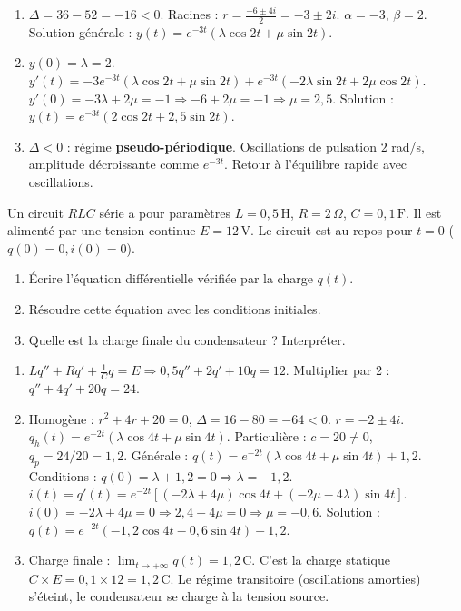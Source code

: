 \documentclass[11pt]{article}
\begin{document}
\begin{corrige}[Exercice]
\begin{enumerate}
\item $\Delta = 36 - 52 = -16 < 0$. Racines : $r = \frac{-6 \pm 4i}{2} = -3 \pm 2i$. $\alpha = -3$, $\beta = 2$.
Solution générale : $y(t) = e^{-3t}(\lambda \cos 2t + \mu \sin 2t)$.
\item $y(0) = \lambda = 2$.
$y'(t) = -3e^{-3t}(\lambda \cos 2t + \mu \sin 2t) + e^{-3t}(-2\lambda \sin 2t + 2\mu \cos 2t)$.
$y'(0) = -3\lambda + 2\mu = -1 \Rightarrow -6 + 2\mu = -1 \Rightarrow \mu = 2,5$.
Solution : $\boxed{y(t) = e^{-3t}(2\cos 2t + 2,5\sin 2t)}$.
\item $\Delta < 0$ : régime \textbf{pseudo-périodique}. Oscillations de pulsation $2$ rad/s, amplitude décroissante comme $e^{-3t}$. Retour à l'équilibre rapide avec oscillations.
\end{enumerate}
\end{corrige}

\begin{exercice}
Un circuit $RLC$ série a pour paramètres $L = 0,5\,\text{H}$, $R = 2\,\Omega$, $C = 0,1\,\text{F}$. Il est alimenté par une tension continue $E = 12\,\text{V}$. Le circuit est au repos pour $t=0$ ($q(0)=0, i(0)=0$).
\begin{enumerate}
\item Écrire l'équation différentielle vérifiée par la charge $q(t)$.
\item Résoudre cette équation avec les conditions initiales.
\item Quelle est la charge finale du condensateur ? Interpréter.
\end{enumerate}
\end{exercice}

\begin{corrige}[Exercice]
\begin{enumerate}
\item $L q'' + R q' + \frac{1}{C}q = E \Rightarrow 0,5 q'' + 2 q' + 10 q = 12$.
Multiplier par 2 : $q'' + 4 q' + 20 q = 24$.
\item Homogène : $r^2 + 4r + 20 = 0$, $\Delta = 16 - 80 = -64 < 0$.
$r = -2 \pm 4i$. $q_h(t) = e^{-2t}(\lambda \cos 4t + \mu \sin 4t)$.
Particulière : $c=20 \neq 0$, $q_p = 24/20 = 1,2$.
Générale : $q(t) = e^{-2t}(\lambda \cos 4t + \mu \sin 4t) + 1,2$.
Conditions : $q(0) = \lambda + 1,2 = 0 \Rightarrow \lambda = -1,2$.
$i(t) = q'(t) = e^{-2t}[(-2\lambda + 4\mu)\cos 4t + (-2\mu - 4\lambda)\sin 4t]$.
$i(0) = -2\lambda + 4\mu = 0 \Rightarrow 2,4 + 4\mu = 0 \Rightarrow \mu = -0,6$.
Solution : $\boxed{q(t) = e^{-2t}(-1,2\cos 4t - 0,6\sin 4t) + 1,2}$.
\item Charge finale : $\lim_{t\to+\infty} q(t) = 1,2\,\text{C}$. C'est la charge statique $C \times E = 0,1 \times 12 = 1,2\,\text{C}$. Le régime transitoire (oscillations amorties) s'éteint, le condensateur se charge à la tension source.
\end{enumerate}
\end{corrige}
\end{document}
